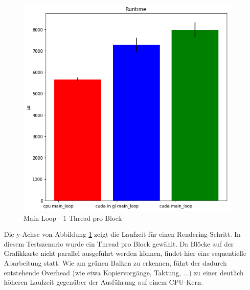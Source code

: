 \documentclass[conference]{IEEEtran}
\begin{document}
\begin{figure}[H]
\centerline{\includegraphics[scale=0.35]{img/main_loop_1threads.png}}
\label{fig:main_loop_1threads}
\caption{Main Loop - 1 Thread pro Block}
\end{figure}
Die y-Achse von Abbildung \ref{fig:main_loop_1threads} zeigt die Laufzeit f\"ur einen Rendering-Schritt. In diesem Testszenario wurde ein Thread pro Block gew\"ahlt. Da Bl\"ocke auf der Grafikkarte nicht parallel ausgef\"uhrt werden k\"onnen, findet hier eine sequentielle Abarbeitung statt. Wie am gr\"unen Balken zu erkennen, f\"uhrt der dadurch entstehende Overhead (wie etwa Kopiervorg\"ange, Taktung, ...) zu einer deutlich h\"oheren Laufzeit gegen\"uber der Ausf\"uhrung auf einem CPU-Kern.
\end{document}
